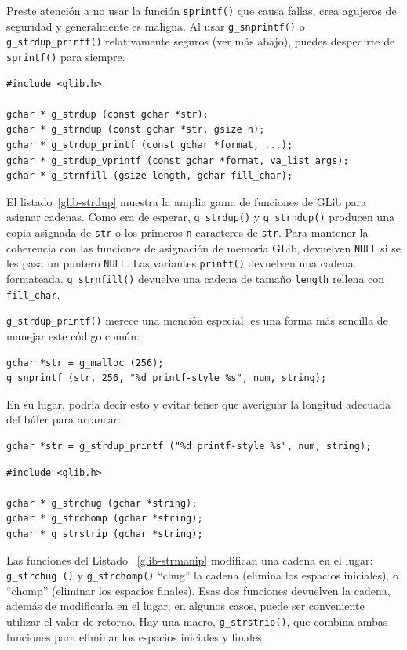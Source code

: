 Preste atención a no usar la función \lstinline{sprintf()} que causa fallas, crea agujeros de seguridad y generalmente es maligna. Al usar \lstinline{g_snprintf()} o \lstinline{g_strdup_printf()} relativamente seguros (ver más abajo), puedes despedirte de \lstinline{sprintf()} para siempre.

\begin{lstlisting}[float, caption={Allocating Strings}, label=glib-strdup]
#include <glib.h>

gchar * g_strdup (const gchar *str);
gchar * g_strndup (const gchar *str, gsize n);
gchar * g_strdup_printf (const gchar *format, ...);
gchar * g_strdup_vprintf (const gchar *format, va_list args);
gchar * g_strnfill (gsize length, gchar fill_char);
\end{lstlisting}

El listado~\ref{glib-strdup} muestra la amplia gama de funciones de GLib para asignar cadenas. Como era de esperar, \lstinline{g_strdup()} y \lstinline{g_strndup()} producen una copia asignada de \lstinline{str} o los primeros \lstinline{n} caracteres de \lstinline{str}. Para mantener la coherencia con las funciones de asignación de memoria GLib, devuelven \lstinline{NULL} si se les pasa un puntero \lstinline{NULL}. Las variantes \lstinline{printf()} devuelven una cadena formateada. \lstinline{g_strnfill()} devuelve una cadena de tamaño \lstinline{length} rellena con \lstinline{fill_char}.

\lstinline{g_strdup_printf()} merece una mención especial; es una forma más sencilla de manejar este código común:
\begin{lstlisting}
gchar *str = g_malloc (256);
g_snprintf (str, 256, "%d printf-style %s", num, string);
\end{lstlisting}

En su lugar, podría decir esto y evitar tener que averiguar la longitud adecuada del búfer para arrancar:
\begin{lstlisting}
gchar *str = g_strdup_printf ("%d printf-style %s", num, string);
\end{lstlisting}

\begin{lstlisting}[float, caption={In-place string modifications}, label=glib-strmanip]
#include <glib.h>

gchar * g_strchug (gchar *string);
gchar * g_strchomp (gchar *string);
gchar * g_strstrip (gchar *string);
\end{lstlisting}

Las funciones del Listado ~\ref{glib-strmanip} modifican una cadena en el lugar: \lstinline{g_strchug ()} y \lstinline{g_strchomp()} ``chug'' la cadena (elimina los espacios iniciales), o ``chomp'' (eliminar los espacios finales). Esas dos funciones devuelven la cadena, además de modificarla en el lugar; en algunos casos, puede ser conveniente utilizar el valor de retorno. Hay una macro, \lstinline{g_strstrip()}, que combina ambas funciones para eliminar los espacios iniciales y finales.

